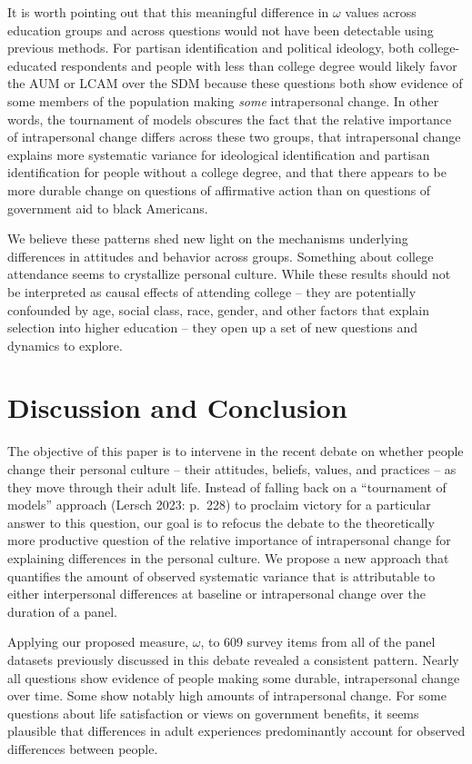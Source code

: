\documentclass[
  12pt,
]{article}
\begin{document}
It is worth pointing out that this meaningful difference in \(\omega\)
values across education groups and across questions would not have been
detectable using previous methods. For partisan identification and
political ideology, both college-educated respondents and people with
less than college degree would likely favor the AUM or LCAM over the SDM
because these questions both show evidence of some members of the
population making \emph{some} intrapersonal change. In other words, the
tournament of models obscures the fact that the relative importance of
intrapersonal change differs across these two groups, that intrapersonal
change explains more systematic variance for ideological identification
and partisan identification for people without a college degree, and
that there appears to be more durable change on questions of affirmative
action than on questions of government aid to black Americans.

We believe these patterns shed new light on the mechanisms underlying
differences in attitudes and behavior across groups. Something about
college attendance seems to crystallize personal culture. While these
results should not be interpreted as causal effects of attending college
-- they are potentially confounded by age, social class, race, gender,
and other factors that explain selection into higher education -- they
open up a set of new questions and dynamics to explore.

\hypertarget{discussion-and-conclusion}{%
\section{Discussion and Conclusion}\label{discussion-and-conclusion}}

The objective of this paper is to intervene in the recent debate on
whether people change their personal culture -- their attitudes,
beliefs, values, and practices -- as they move through their adult life.
Instead of falling back on a ``tournament of models'' approach (Lersch
2023: p.~228) to proclaim victory for a particular answer to this
question, our goal is to refocus the debate to the theoretically more
productive question of the relative importance of intrapersonal change
for explaining differences in the personal culture. We propose a new
approach that quantifies the amount of observed systematic variance that
is attributable to either interpersonal differences at baseline or
intrapersonal change over the duration of a panel.

Applying our proposed measure, \(\omega\), to 609 survey items from all
of the panel datasets previously discussed in this debate revealed a
consistent pattern. Nearly all questions show evidence of people making
some durable, intrapersonal change over time. Some show notably high
amounts of intrapersonal change. For some questions about life
satisfaction or views on government benefits, it seems plausible that
differences in adult experiences predominantly account for observed
differences between people.
\end{document}
